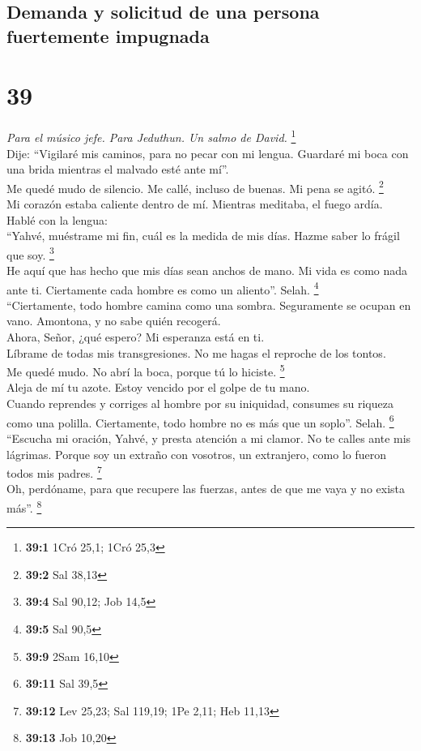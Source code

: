 \hypertarget{demanda-y-solicitud-de-una-persona-fuertemente-impugnada}{%
\subsection{Demanda y solicitud de una persona fuertemente
impugnada}\label{demanda-y-solicitud-de-una-persona-fuertemente-impugnada}}

\hypertarget{section-37}{%
\section{39}\label{section-37}}

\emph{Para el músico jefe. Para Jeduthun. Un salmo de David.}
\footnote{\textbf{39:1} 1Cró 25,1; 1Cró 25,3}\\
 Dije: ``Vigilaré mis caminos, para no pecar con mi
lengua. Guardaré mi boca con una brida mientras el malvado esté ante
mí''.\\
 Me quedé mudo de silencio. Me callé, incluso de buenas.
Mi pena se agitó. \footnote{\textbf{39:2} Sal 38,13}\\
 Mi corazón estaba caliente dentro de mí. Mientras
meditaba, el fuego ardía. Hablé con la lengua:\\
 ``Yahvé, muéstrame mi fin, cuál es la medida de mis días.
Hazme saber lo frágil que soy. \footnote{\textbf{39:4} Sal 90,12; Job
  14,5}\\
 He aquí que has hecho que mis días sean anchos de mano.
Mi vida es como nada ante ti. Ciertamente cada hombre es como un
aliento''. Selah. \footnote{\textbf{39:5} Sal 90,5}\\
 ``Ciertamente, todo hombre camina como una sombra.
Seguramente se ocupan en vano. Amontona, y no sabe quién recogerá.\\
 Ahora, Señor, ¿qué espero? Mi esperanza está en ti.\\
 Líbrame de todas mis transgresiones. No me hagas el
reproche de los tontos.\\
 Me quedé mudo. No abrí la boca, porque tú lo hiciste.
\footnote{\textbf{39:9} 2Sam 16,10}\\
 Aleja de mí tu azote. Estoy vencido por el golpe de tu
mano.\\
 Cuando reprendes y corriges al hombre por su iniquidad,
consumes su riqueza como una polilla. Ciertamente, todo hombre no es más
que un soplo''. Selah. \footnote{\textbf{39:11} Sal 39,5}\\
 ``Escucha mi oración, Yahvé, y presta atención a mi
clamor. No te calles ante mis lágrimas. Porque soy un extraño con
vosotros, un extranjero, como lo fueron todos mis padres. \footnote{\textbf{39:12}
  Lev 25,23; Sal 119,19; 1Pe 2,11; Heb 11,13}\\
 Oh, perdóname, para que recupere las fuerzas, antes de
que me vaya y no exista más''. \footnote{\textbf{39:13} Job 10,20}

